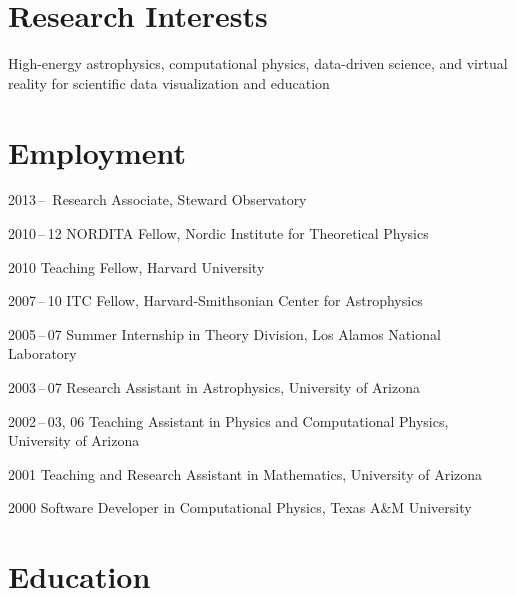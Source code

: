 \section*{Research Interests}

High-energy astrophysics, computational physics, data-driven science,
and virtual reality for scientific data visualization and education

\section*{Employment}

\begin{tlist}

\item[2013\,--\,] Research Associate, Steward Observatory

\item[2010\,--\,12] NORDITA Fellow, Nordic Institute for Theoretical Physics

\item[2010] Teaching Fellow, Harvard University

\item[2007\,--\,10] ITC Fellow, Harvard-Smithsonian Center for Astrophysics

\item[2005\,--\,07] Summer Internship in Theory Division,
  Los Alamos National Laboratory

\item[2003\,--\,07] Research Assistant in Astrophysics, University of Arizona

\item[2002\,--\,03, 06] Teaching Assistant in Physics and
  Computational Physics, University of Arizona

\item[2001] Teaching and Research Assistant in Mathematics,
  University of Arizona

\item[2000] Software Developer in Computational Physics,
  Texas A\&M University

\end{tlist}

\section*{Education}

